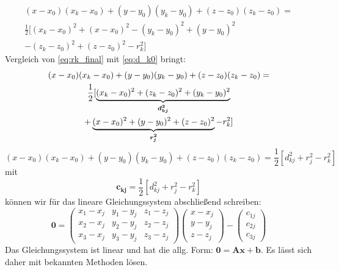 %
\begin{multline}\label{eq:rk_final}
(x-x_0)(x_k-x_0)+(y-y_0)(y_k-y_0)+(z-z_0)(z_k-z_0)= \\\frac{1}{2}[(x_k-x_0)^2+(x-x_0)^2-(y_k-y_0)^2+(y-y_0)^2
\\-(z_k-z_0)^2 +(z-z_0)^2-r_k^2]
\end{multline}
%
Vergleich von \eqref{eq:rk_final} mit \eqref{eq:d_k0} bringt: 
%
\begin{multline}
(x-x_0)(x_k-x_0)+(y-y_0)(y_k-y_0)+(z-z_0)(z_k-z_0)= \\\frac{1}{2}[\underbrace{(x_k-x_0)^2+(z_k-z_0)^2+(y_k-y_0)^2}_\text{\boldmath{$d_{kj}^2$}}
\\+\underbrace{(x-x_0)^2+(y-y_0)^2 +(z-z_0)^2}_\text{\boldmath{$r_j^2$}}-r_k^2]
\end{multline}
%
\begin{equation}
(x-x_0)(x_k-x_0)+(y-y_0)(y_k-y_0)+(z-z_0)(z_k-z_0)=\frac{1}{2}[d_{kj}^2+r_{j}^2-r_k^2]\label{eq:rk_final_simplyfied}
\end{equation}
mit 
\begin{equation}\label{eq:c_kj}
\mathbf{c_{kj}}=\frac{1}{2}[d_{kj}^2+r_{j}^2-r_k^2]
\end{equation}
können wir für das lineare Gleichungssystem abschließend schreiben:
%
\begin{equation}
\mathbf{0}=
\left(
	\begin{array}{ccc}
		x_1-x_j & y_1-y_j & z_1-z_j \\
		x_2-x_j & y_2-y_j & z_2-z_j \\
		x_3-x_j & y_3-y_j & z_3-z_j
	\end{array}
\right)
\left(
   \begin{array}{c}
	   x-x_j\\
	   y-y_j\\
	   z-z_j
   \end{array}
\right)
-
\left(
	\begin{array}{c}
		c_{1j}\\
		c_{2j}\\
		c_{3j}
	\end{array}
\right)
\end{equation}
%
Das Gleichungssystem ist linear und hat die allg. Form: $\mathbf{0} = \mathbf{Ax}+\mathbf{b}$. Es lässt sich daher mit bekannten Methoden lösen.



